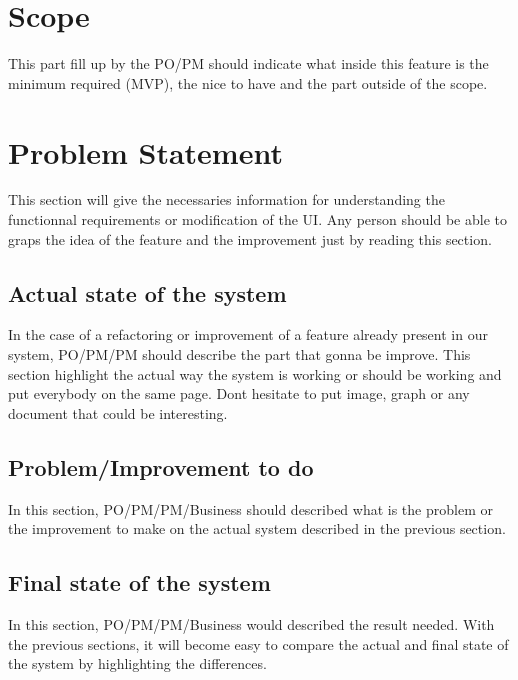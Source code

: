 \documentclass[a4paper,article,oneside]{memoir}
\begin{document}
        \section{Scope}
        This part fill up by the \gls{PO}/\gls{PM} should indicate what inside this feature is the minimum required (MVP), the nice to have and the part outside of the scope.

\noindent{}


        \section{Problem Statement}
        This section will give the necessaries information for understanding the functionnal requirements or modification of the UI. Any person should be able to graps the idea of the feature and the improvement just by reading this section.
        \subsection{Actual state of the system}
        	In the case of a refactoring or improvement of a feature already present in our system, \gls{PO}/\gls{PM}/\gls{PM} should describe the part that gonna be improve. This section highlight the actual way the system is working or should be working and put everybody on the same page. Dont hesitate to put image, graph or any document that could be interesting.
        \subsection{Problem/Improvement to do}
        In this section, \gls{PO}/\gls{PM}/\gls{PM}/\gls{Business} should described what is the problem or the improvement to make on the actual system described in the previous section.
        \subsection{Final state of the system}
        In this section, \gls{PO}/\gls{PM}/\gls{PM}/\gls{Business} would described the result needed. With the previous sections, it will become easy to compare the actual and final state of the system by highlighting the differences.
\end{document}
